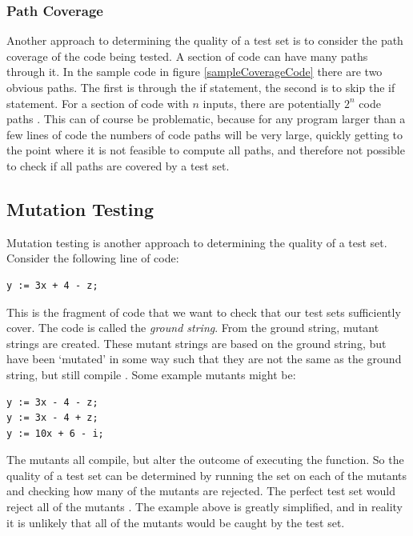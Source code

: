 \subsubsection{Path Coverage}

Another approach to determining the quality of a test set is to consider the path coverage of the code being tested. A section of code can have many paths through it. In the sample code in figure \ref{sampleCoverageCode} there are two obvious paths. The first is through the if statement, the second is to skip the if statement. For a section of code with $n$ inputs, there are potentially $2^n$ code paths \cite{something}. This can of course be problematic, because for any program larger than a few lines of code the numbers of code paths will be very large, quickly getting to the point where it is not feasible to compute all paths, and therefore not possible to check if all paths are covered by a test set.

\subsection{Mutation Testing}

Mutation testing is another approach to determining the quality of a test set. Consider the following line of code:

\begin{lstlisting}
y := 3x + 4 - z;
\end{lstlisting}

This is the fragment of code that we want to check that our test sets sufficiently cover. The code is called the \emph{ground string}. From the ground string, mutant strings are created. These mutant strings are based on the ground string, but have been `mutated' in some way such that they are not the same as the ground string, but still compile \citep{softwareTestingIntro}. Some example mutants might be:

\begin{lstlisting}
y := 3x - 4 - z;
y := 3x - 4 + z;
y := 10x + 6 - i;
\end{lstlisting}

The mutants all compile, but alter the outcome of executing the function. So the quality of a test set can be determined by running the set on each of the mutants and checking how many of the mutants are rejected. The perfect test set would reject all of the mutants \citep{softwareTestingIntro}. The example above is greatly simplified, and in reality it is unlikely that all of the mutants would be caught by the test set.

